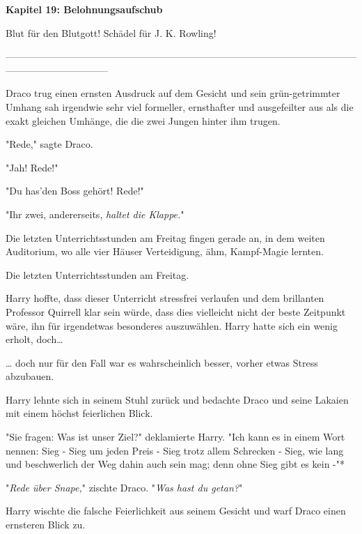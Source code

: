 

\hypertarget{belohnungsaufschub}{%

\textbf{Kapitel 19: Belohnungsaufschub\\ }

Blut für den Blutgott! Schädel für J. K. Rowling!

--------------------------------------------------------------------------------------------------------------------------------------------

Draco trug einen ernsten Ausdruck auf dem Gesicht und sein grün-getrimmter Umhang sah irgendwie sehr viel formeller, ernsthafter und ausgefeilter aus als die exakt gleichen Umhänge, die die zwei Jungen hinter ihm trugen.

"Rede," sagte Draco.

"Jah! Rede!"

"Du has'den Boss gehört! Rede!"

"Ihr zwei, andererseits, \emph{haltet die Klappe.}"

Die letzten Unterrichtsstunden am Freitag fingen gerade an, in dem weiten Auditorium, wo alle vier Häuser Verteidigung, ähm, Kampf-Magie lernten.

Die letzten Unterrichtsstunden am Freitag.

Harry hoffte, dass dieser Unterricht stressfrei verlaufen und dem brillanten Professor Quirrell klar sein würde, dass dies vielleicht nicht der beste Zeitpunkt wäre, ihn für irgendetwas besonderes auszuwählen. Harry hatte sich ein wenig erholt, doch…

… doch nur für den Fall war es wahrscheinlich besser, vorher etwas Stress abzubauen.

Harry lehnte sich in seinem Stuhl zurück und bedachte Draco und seine Lakaien mit einem höchst feierlichen Blick.

"Sie fragen: Was ist unser Ziel?" deklamierte Harry. "Ich kann es in einem Wort nennen: Sieg - Sieg um jeden Preis - Sieg trotz allem Schrecken - Sieg, wie lang und beschwerlich der Weg dahin auch sein mag; denn ohne Sieg gibt es kein -"*

"\emph{Rede über Snape,}" zischte Draco. "\emph{Was hast du getan?}"

Harry wischte die falsche Feierlichkeit aus seinem Gesicht und warf Draco einen ernsteren Blick zu.

}
